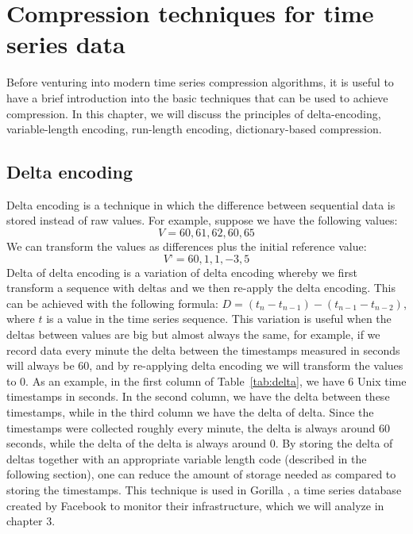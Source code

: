 
\chapter{Compression techniques for time series data}
Before venturing into modern time series compression algorithms, it is useful to have a brief
introduction into the basic techniques that can be used to achieve compression. In this chapter,
we will discuss the principles of delta-encoding, variable-length encoding, run-length encoding,
dictionary-based compression.

\section{Delta encoding}
Delta encoding is a technique in which the difference between sequential data is stored instead
of raw values. For example, suppose we have the following values:
$$V= 60, 61, 62, 60, 65$$
We can transform the values as differences plus the initial reference value:
$$V’= 60, 1, 1, -3, 5$$
Delta of delta encoding is a variation of delta encoding whereby we first transform a sequence
with deltas and we then re-apply the delta encoding. This can be achieved with the following
formula: $D = (t_{n} - t_{n-1}) - (t_{n-1} - t_{n-2})$, where $t$ is a value in the time series
sequence. This variation is useful when the deltas between values are big but almost always
the same, for example, if we record data every minute the delta between the timestamps measured
in seconds will always be 60, and by re-applying delta encoding we will transform the values
to 0. As an example, in the first column of Table~\ref{tab:delta}, we have 6 Unix time timestamps
in seconds. In the second column, we have the delta between these timestamps, while in the
third column we have the delta of delta.
Since the timestamps were collected roughly every minute, the delta is always around 60 seconds,
while the delta of the delta is always around 0. By storing the delta of deltas together with
an appropriate variable length code (described in the following section), one can reduce the
amount of storage needed as compared to storing the timestamps.
This technique is used in Gorilla \cite{Pelkonen:2015}, a time series database created
by Facebook to monitor their infrastructure, which we will analyze in chapter 3.

